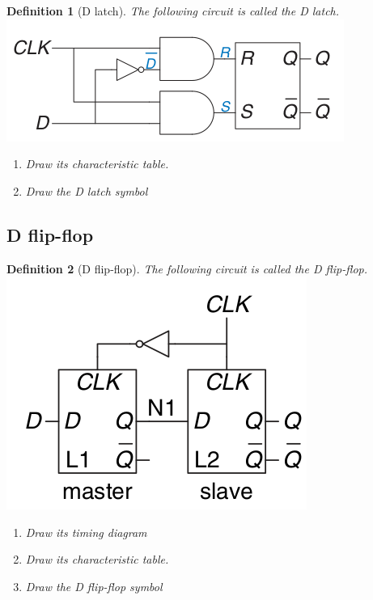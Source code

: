 \documentclass{article}
\newtheorem{definition}{Definition}
\begin{document}
\begin{definition}[D latch]
  The following circuit is called the D latch. \\
  \includegraphics[width=0.6\linewidth]{./fig/fig3.7-D-latch.png} \\
  \begin{enumerate}
  \item Draw its characteristic table.
  \item Draw the D latch symbol
  \end{enumerate}
\end{definition}
\vspace{20em}

\subsection{D flip-flop \cite[Sec~3.2.2]{harris2022digital}}

\begin{definition}[D flip-flop]
  The following circuit is called the D flip-flop. \\
  \includegraphics[width=0.6\linewidth]{./fig/fig3.8-D-flip-flop.png} \\
  \begin{enumerate}
  \item Draw its timing  diagram
  \item Draw its characteristic table.
  \item Draw the D flip-flop symbol
  \end{enumerate}
\end{definition}
\vspace{20em}
\end{document}
